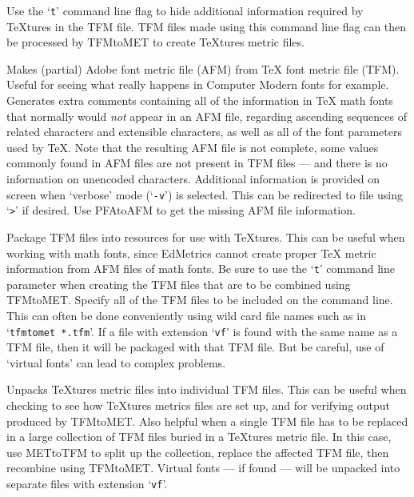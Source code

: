 Use the `{\tt t}' command line flag to hide
additional information required by {\TeX}tures in the TFM file.
TFM files made using this command line flag can then be processed 
by TFMtoMET to create {\TeX}tures metric files.


Makes (partial) Adobe font metric file (AFM) from {\TeX} 
font metric file (TFM).  
Useful for seeing what really happens in Computer Modern
fonts for example.  Generates extra comments containing all
of the information in {\TeX} math fonts that normally would
{\it not} appear in an AFM file, regarding ascending sequences of
related characters and extensible characters, as well as all
of the font parameters used by {\TeX}.  
Note that the resulting AFM file is not complete,
some values commonly found in AFM files are not present in TFM files ---
and there is no information on unencoded characters.
Additional information is provided
on screen when `verbose' mode (`{\tt -v}') is selected.  
This can be redirected  to file using `{\tt >}' if desired.
%
Use PFAtoAFM to get the missing AFM file information.


Package TFM files into resources for use with {\TeX}tures.
This can be useful when working with math fonts, since
EdMetrics cannot create proper {\TeX} metric information	
from AFM files of math fonts.  
Be sure to use the `{\tt t}' command line parameter when creating the TFM
files that are to be combined using TFMtoMET.
Specify all of the TFM files to be included on the command line.
This can often be done conveniently using wild card file names such as in
`{\tt tfmtomet *.tfm}'.
%
If a file with extension `{\tt vf}' is found with the same name as a
TFM file, then it will be packaged with that TFM file.
But be careful, use of `virtual fonts' can lead to complex problems.


Unpacks {\TeX}tures metric files into individual TFM files.
This can be useful when checking to see how {\TeX}tures metrics files are set
up, and for verifying output produced by TFMtoMET.
Also helpful when a single TFM file has to be replaced in 
a large collection of TFM files buried in a {\TeX}tures metric file.
In this case, use METtoTFM to split up the collection, 
replace the affected TFM file, then recombine using TFMtoMET.
%
Virtual fonts --- if found --- will be unpacked into separate files
with extension `{\tt vf}'.

